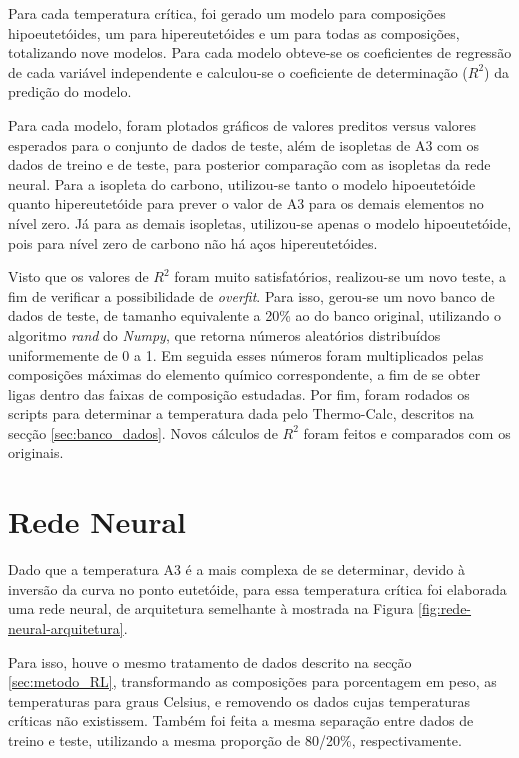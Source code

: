 \documentclass[brazil,tf,epusp]{usp}  %
\begin{document}
Para cada temperatura crítica, foi gerado um modelo para composições hipoeutetóides, um para hipereutetóides e um para todas as composições, totalizando nove modelos. Para cada modelo obteve-se os coeficientes de regressão de cada variável independente e calculou-se o coeficiente de determinação ($R^{2}$) da predição do modelo.

Para cada modelo, foram plotados gráficos de valores preditos versus valores esperados para o conjunto de dados de teste, além de isopletas de A3 com os dados de treino e de teste, para posterior comparação com as isopletas da rede neural. Para a isopleta do carbono, utilizou-se tanto o modelo hipoeutetóide quanto hipereutetóide para prever o valor de A3 para os demais elementos no nível zero. Já para as demais isopletas, utilizou-se apenas o modelo hipoeutetóide, pois para nível zero de carbono não há aços hipereutetóides.

Visto que os valores de $R^{2}$ foram muito satisfatórios, realizou-se um novo teste, a fim de verificar a possibilidade de \textit{overfit}. Para isso, gerou-se um novo banco de dados de teste, de tamanho equivalente a 20\% ao do banco original, utilizando o algoritmo \textit{rand} do \textit{Numpy}, que retorna números aleatórios distribuídos uniformemente de 0 a 1. Em seguida esses números foram multiplicados pelas composições máximas do elemento químico correspondente, a fim de se obter ligas dentro das faixas de composição estudadas. Por fim, foram rodados os scripts para determinar a temperatura dada pelo Thermo-Calc\textregistered{}, descritos na secção \ref{sec:banco_dados}. Novos cálculos de $R^{2}$ foram feitos e comparados com os originais.

\section{Rede Neural}
Dado que a temperatura A3 é a mais complexa de se determinar, devido à inversão da curva no ponto eutetóide, para essa temperatura crítica foi elaborada uma rede neural, de arquitetura semelhante à mostrada na Figura \ref{fig:rede-neural-arquitetura}.

Para isso, houve o mesmo tratamento de dados descrito na secção \ref{sec:metodo_RL}, transformando as composições para porcentagem em peso, as temperaturas para graus Celsius, e removendo os dados cujas temperaturas críticas não existissem. Também foi feita a mesma separação entre dados de treino e teste, utilizando a mesma proporção de 80/20\%, respectivamente.
\end{document}
